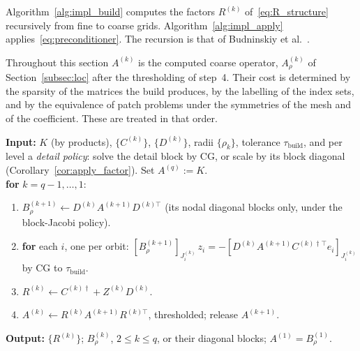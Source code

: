 \documentclass[hidelinks]{siamart}
\theoremstyle{nonumberplain}
\numberwithin{theorem}{section}
\begin{document}
Algorithm~\ref{alg:impl_build} computes the factors $R^{(k)}$
of~\eqref{eq:R_structure} recursively from fine to coarse grids.
Algorithm~\ref{alg:impl_apply} applies~\eqref{eq:preconditioner}.
The recursion is that of Budninskiy et al.~\cite{budni2019}.

Throughout this section $A^{(k)}$ is the computed coarse operator,
$A^{(k)}_\rho$ of Section~\ref{subsec:loc} after the thresholding of
step~4.  Their cost is determined by the sparsity of the matrices the
build produces, by the labelling of the index sets, and by the equivalence of
patch problems under the symmetries of the mesh and of the
coefficient.  These are treated in that order.

\begin{algorithm}[t]
\caption{Build}
\label{alg:impl_build}
\textbf{Input:} $K$ (by products), $\{C^{(k)}\}$, $\{D^{(k)}\}$, radii
$\{\rho_k\}$, tolerance $\tau_{\mathrm{build}}$, and per level a
\emph{detail policy}: solve the detail block by CG, or scale by its
block diagonal (Corollary~\ref{cor:apply_factor}).
Set $A^{(q)} := K$.\\[2pt]
\textbf{for} $k = q-1, \ldots, 1$:
\begin{enumerate}
  \item[1.] $B^{(k+1)}_\rho \gets D^{(k)} A^{(k+1)} D^{(k)\top}$
    (its nodal diagonal blocks only, under the block-Jacobi policy).
  \item[2.] \textbf{for} each $i$, one per orbit:
    $[B^{(k+1)}_\rho]_{J^{(k)}_i}\, z_i =
     -[D^{(k)} A^{(k+1)} C^{(k)\dagger\top} e_i]_{J^{(k)}_i}$
    by CG to $\tau_{\mathrm{build}}$.
  \item[3.] $R^{(k)} \gets C^{(k)\dagger} + Z^{(k)} D^{(k)}$.
  \item[4.] $A^{(k)} \gets R^{(k)} A^{(k+1)} R^{(k)\top}$, thresholded;
    release $A^{(k+1)}$.
\end{enumerate}
\textbf{Output:} $\{R^{(k)}\}$; $B^{(k)}_\rho$, $2 \leq k \leq q$, or
their diagonal blocks; $A^{(1)} = B^{(1)}_\rho$.
\end{algorithm}
\end{document}
